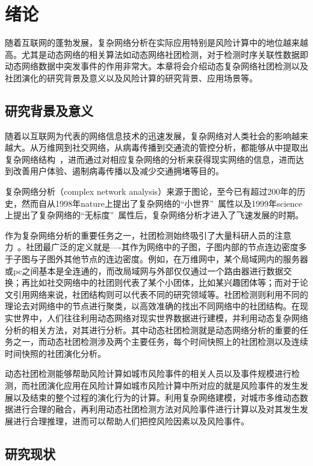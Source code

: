 
\chapter{绪论}
随着互联网的蓬勃发展，复杂网络分析在实际应用特别是风险计算中的地位越来越高。尤其是动态网络的相关算法如动态网络社团检测，对于检测时序关联性数据即动态网络数据中突发事件的作用非常大。本章将会介绍动态复杂网络社团检测以及社团演化的研究背景及意义以及风险计算的研究背景、应用场景等。

\section{研究背景及意义}
随着以互联网为代表的网络信息技术的迅速发展，复杂网络对人类社会的影响越来越大。从万维网到社交网络，从病毒传播到交通流的管控分析，都能够从中提取出复杂网络结构~\cite{ben2004complex}，进而通过对相应复杂网络的分析来获得现实网络的信息，进而达到改善用户体验、遏制病毒传播以及减少交通拥堵等目的。

复杂网络分析（complex network analysis）来源于图论，至今已有超过200年的历史，然而自从1998年nature上提出了复杂网络的“小世界”~\cite{watts1998collective}属性以及1999年science上提出了复杂网络的“无标度”~\cite{barabasi1999emergence}属性后，复杂网络分析才进入了飞速发展的时期。

作为复杂网络分析的重要任务之一，社团检测始终吸引了大量科研人员的注意力~\cite{rossetti2018community}。社团最广泛的定义就是----其作为网络中的子图，子图内部的节点连边密度多于子图与子图外其他节点的连边密度。例如，在万维网中，某个局域网内的服务器或pc之间基本是全连通的，而改局域网与外部仅仅通过一个路由器进行数据交换；再比如社交网络中的社团则代表了某个小团体，比如某兴趣团体等；而对于论文引用网络来说，社团结构则可以代表不同的研究领域等。社团检测则利用不同的理论去对网络中的节点进行聚类，以高效准确的找出不同网络中的社团结构。在现实世界中，人们往往利用动态网络对现实世界数据进行建模，并利用动态复杂网络分析的相关方法，对其进行分析。其中动态社团检测就是动态网络分析的重要的任务之一，而动态社团检测涉及两个主要任务，每个时间快照上的社团检测以及连续时间快照的社团演化分析。

动态社团检测能够帮助风险计算如城市风险事件的相关人员以及事件规模进行检测，而社团演化应用在风险计算如城市风险计算中所对应的就是风险事件的发生发展以及结束的整个过程的演化行为的计算。利用复杂网络建模，对城市多维动态数据进行合理的融合，再利用动态社团检测方法对风险事件进行计算以及对其发生发展进行合理推理，进而可以帮助人们把控风险因素以及风险事件。

\section{研究现状}
